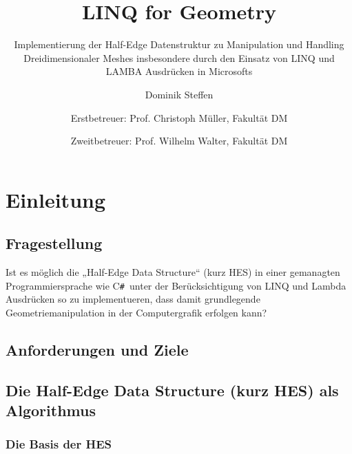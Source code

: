\documentclass[pagesize, paper=a4, fontsize=12pt,titlepage=true, headings=small, headnosepline, abstractoff, liststotoc, nochapterprefix, plainheadsepline]{scrreprt}
\author{
Dominik Steffen \and
Erstbetreuer: Prof. Christoph Müller, Fakultät DM \and
Zweitbetreuer: Prof. Wilhelm Walter, Fakultät DM
}
\title{LINQ for Geometry}
\subtitle{Implementierung der Half-Edge Datenstruktur zu Manipulation und Handling Dreidimensionaler Meshes insbesondere durch den Einsatz von LINQ und LAMBA Ausdrücken in Microsofts \CS}
\newcommand{\CSS}{C\texttt{\# }}
\begin{document}
\maketitle

\begingroup
	\clearpage
	\pagestyle{empty}
	\renewcommand*{\chapterpagestyle}{empty}
	\tableofcontents
	\clearpage
\endgroup

\pagestyle{plain}
\setcounter{page}{1}









\chapter {Einleitung}
	\section {Fragestellung}
		Ist es möglich die „Half-Edge Data Structure“ (kurz HES) in einer gemanagten Programmiersprache wie \CSS unter der Berücksichtigung von LINQ und Lambda Ausdrücken so zu implementueren, dass damit grundlegende Geometriemanipulation in der Computergrafik erfolgen kann?
	\section {Anforderungen und Ziele}
	
	\section {Die Half-Edge Data Structure (kurz HES) als Algorithmus}
		\subsection {Die Basis der HES}
\end{document}
